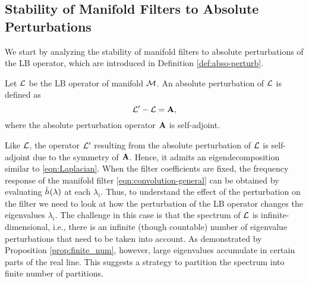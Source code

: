 
\subsection{Stability of Manifold Filters to Absolute Perturbations}
\label{subsec:filter-absolute}
We start by analyzing the stability of manifold filters to absolute perturbations of the LB operator, which are introduced in Definition \ref{def:abso-perturb}.

\begin{definition} \label{def:abso-perturb}
Let ${\mathcal L}$ be the LB operator of manifold ${\mathcal M}$. An absolute perturbation of ${\mathcal L}$ is defined as
\begin{equation}\label{eqn:abso-perturb}
{\ensuremath{\mathcal L}}'-{\mathcal L}={\mathbf A},
\end{equation}
where the absolute perturbation operator ${\mathbf A}$ is self-adjoint.
\end{definition}

Like ${\mathcal L}$, the operator ${\mathcal L}'$ resulting from the absolute perturbation of ${\mathcal L}$ is self-adjoint due to the symmetry of ${\mathbf A}$. Hence, it admits an eigendecomposition similar to \eqref{eqn:Laplacian}. When the filter coefficients are fixed, the frequency response of the manifold filter \eqref{eqn:convolution-general} can be obtained by evaluating ${\hat h}(\lambda)$ at each $\lambda_i$. Thus, to understand the effect of the perturbation on the filter we need to look at how the perturbation of the LB operator changes the eigenvalues $\lambda_i$. The challenge in this case is that the spectrum of ${\mathcal L}$ is infinite-dimensional, i.e., there is an infinite (though countable) number of eigenvalue perturbations that need to be taken into account. 
As demonstrated by Proposition \ref{prop:finite_num}, however, large eigenvalues accumulate in certain parts of the real line. This suggests a strategy to partition the spectrum into finite number of partitions. 


